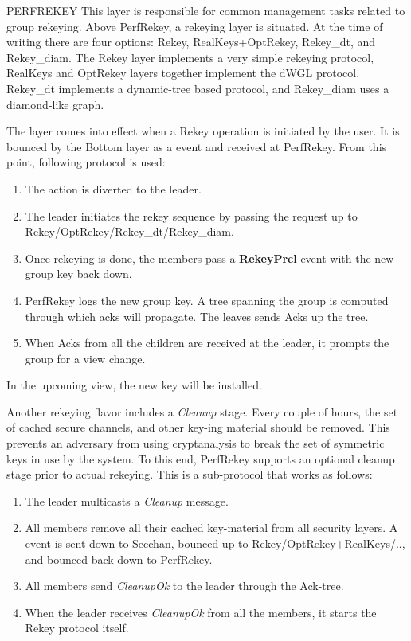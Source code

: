 \begin{Layer}{PERFREKEY}
\label{layer:perfrekey}
This layer is responsible for common management tasks related to group
rekeying. Above PerfRekey, a rekeying layer is situated. At the time
of writing there are four options: Rekey, RealKeys+OptRekey, Rekey\_dt,
and Rekey\_diam. The Rekey layer implements a very simple rekeying
protocol, RealKeys and OptRekey layers together implement the dWGL
protocol. Rekey\_dt implements a dynamic-tree based protocol, and
Rekey\_diam uses a diamond-like graph. 

\begin{Protocol}
The layer comes into effect when a Rekey operation is
initiated by the user. It is bounced by the Bottom layer as a 
event and received at PerfRekey. From this point, following protocol is used: 

\begin{enumerate}
\item The  action is diverted to the leader.
\item The leader initiates the rekey sequence by 
 passing the request up to Rekey/OptRekey/Rekey\_dt/Rekey\_diam.
\item Once rekeying is done, the members pass a {\bf RekeyPrcl} event with 
    the new group key back down. 
\item PerfRekey logs the new group key. A tree spanning the group 
    is computed through which acks will propagate. The leaves 
    sends Acks up the tree.
\item When Acks from all the children are received at the leader,
    it prompts the group for a view change. 
\end{enumerate}

In the upcoming view, the new key will be installed. 

Another rekeying flavor includes a {\it Cleanup} stage. Every couple
of hours, the set of cached secure channels, and other key-ing
material should be removed. This prevents an adversary from using
cryptanalysis to break the set of symmetric keys in use by the
system. To this end, PerfRekey supports an optional cleanup stage
prior to actual rekeying.  This is a sub-protocol that works as follows:
\begin{enumerate}
\item The leader multicasts a {\it Cleanup} message.
\item All members remove all their cached key-material from all
security layers. A  event is sent down to
Secchan, bounced up to Rekey/OptRekey+RealKeys/.., and bounced back down
to PerfRekey.
\item All members send {\it CleanupOk} to the leader through the Ack-tree.
\item When the leader receives {\it CleanupOk} from all the members, it starts
the Rekey protocol itself.
\end{enumerate}


\end{Protocol}
\end{Layer}
